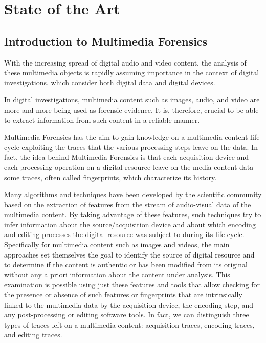 \chapter{State of the Art}

\section{Introduction to Multimedia Forensics}

With the increasing spread of digital audio and video content, the analysis of these multimedia objects is rapidly assuming importance in the context of digital investigations, which consider both digital data and digital devices.

In digital investigations, multimedia content such as images, audio, and video are more and more being used as forensic evidence. It is, therefore, crucial to be able to extract information from such content in a reliable manner.

Multimedia Forensics has the aim to gain knowledge on a multimedia content life cycle exploiting the traces that the various processing steps leave on the data. In fact, the idea behind Multimedia Forensics is that each acquisition device and each processing operation on a digital resource leave on the media content data some traces, often called fingerprints, which characterize its history.

Many algorithms and techniques have been developed by the scientific community based on the extraction of features from the stream of audio-visual data of the multimedia content. By taking advantage of these features, such techniques try to infer information about the source/acquisition device and about which encoding and editing processes the digital resource was subject to during its life cycle. Specifically for multimedia content such as images and videos, the main approaches set themselves the goal to identify the source of digital resource and to determine if the content is authentic or has been modified from its original without any a priori information about the content under analysis. This examination is possible using just these features and tools that allow checking for the presence or absence of such features or fingerprints that are intrinsically linked to the multimedia data by the acquisition device, the encoding step, and any post-processing or editing software tools. In fact, we can distinguish three types of traces left on a multimedia content: acquisition traces, encoding traces, and editing traces.

